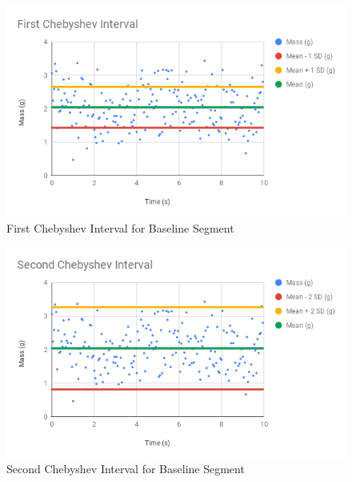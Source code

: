 \begin{figure} \label{figure.baseline.chebyshev.1}
    \begin{center}
        \includegraphics[scale=0.77]{images/00-intro/baseline-chebyshev-1.png}
    \end{center}
    \caption{First Chebyshev Interval for Baseline Segment}
\end{figure}
\begin{figure} \label{figure.baseline.chebyshev.2}
    \begin{center}
        \includegraphics[scale=0.77]{images/00-intro/baseline-chebyshev-2.png}
    \end{center}
    \caption{Second Chebyshev Interval for Baseline Segment}
\end{figure}
